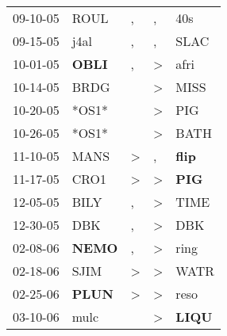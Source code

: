 \begin{supertabular}{p{0.07\textwidth}p{0.06\textwidth}p{0.02\textwidth}p{0.02\textwidth}p{0.06\textwidth}}
          09-10-05\textsuperscript{} &           ROUL\textsuperscript{} &                , &                , &            40s\textsuperscript{} \\
          09-15-05\textsuperscript{} &           j4al\textsuperscript{} &                , &                , &           SLAC\textsuperscript{} \\
          10-01-05\textsuperscript{} &  \textbf{OBLI\textsuperscript{}} &                , &     \textgreater &           afri\textsuperscript{} \\
          10-14-05\textsuperscript{} &           BRDG\textsuperscript{} &                  &     \textgreater &           MISS\textsuperscript{} \\
          10-20-05\textsuperscript{} &                            *OS1* &                  &     \textgreater &            PIG\textsuperscript{} \\
          10-26-05\textsuperscript{} &                            *OS1* &                  &     \textgreater &           BATH\textsuperscript{} \\
          11-10-05\textsuperscript{} &           MANS\textsuperscript{} &     \textgreater &                , &  \textbf{flip\textsuperscript{}} \\
          11-17-05\textsuperscript{} &           CRO1\textsuperscript{} &     \textgreater &     \textgreater &   \textbf{PIG\textsuperscript{}} \\
          12-05-05\textsuperscript{} &           BILY\textsuperscript{} &                , &     \textgreater &           TIME\textsuperscript{} \\
          12-30-05\textsuperscript{} &            DBK\textsuperscript{} &                , &     \textgreater &            DBK\textsuperscript{} \\
          02-08-06\textsuperscript{} &  \textbf{NEMO\textsuperscript{}} &                , &     \textgreater &           ring\textsuperscript{} \\
          02-18-06\textsuperscript{} &           SJIM\textsuperscript{} &     \textgreater &     \textgreater &           WATR\textsuperscript{} \\
          02-25-06\textsuperscript{} &  \textbf{PLUN\textsuperscript{}} &     \textgreater &     \textgreater &           reso\textsuperscript{} \\
          03-10-06\textsuperscript{} &           mulc\textsuperscript{} &                  &     \textgreater &  \textbf{LIQU\textsuperscript{}} \\

\end{supertabular}

